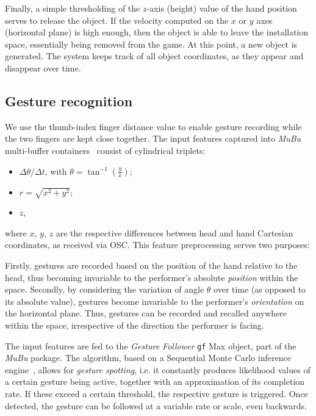 Finally, a simple thresholding of the $z$-axis (height) value of the hand position serves to release the object. If the velocity computed on the $x$ or $y$ axes (horizontal plane) is high enough, then the object is able to leave the installation space, essentially being removed from the game.
At this point, a new object is generated. The system keeps track of all object coordinates, as they appear and disappear over time.


\subsection{Gesture recognition}

We use the thumb-index finger distance value to enable gesture recording while the two fingers are kept close together. The input features captured into \textit{MuBu} multi-buffer containers~\cite{mubu} consist of cylindrical triplets:
\begin{itemize}
	\item $\Delta \theta / \Delta t$, with $\theta = \tan^{-1}(\frac{y}{x})$;
	\item $r = \sqrt{x^2 + y^2}$;
	\item $z$,
\end{itemize}
where $x$, $y$, $z$ are the respective differences between head and hand Cartesian coordinates, as received via OSC. This feature preprocessing serves two purposes:

Firstly, gestures are recorded based on the position of the hand relative to the head, thus becoming invariable to the performer's absolute \textit{position} within the space. Secondly, by considering the variation of angle $\theta$ over time (as opposed to its absolute value), gestures become invariable to the performer's \textit{orientation} on the horizontal plane. Thus, gestures can be recorded and recalled anywhere within the space, irrespective of the direction the performer is facing.

The input features are fed to the \textit{Gesture Follower} \texttt{gf} Max object, part of the \textit{MuBu} package. The algorithm, based on a Sequential Monte Carlo inference engine~\cite{caramiaux2015adaptive}, allows for \textit{gesture spotting}, i.e. it constantly produces likelihood values of a certain gesture being active, together with an approximation of its completion rate. If these exceed a certain threshold, the respective gesture is triggered. Once detected, the gesture can be followed at a variable rate or scale, even backwards. %

